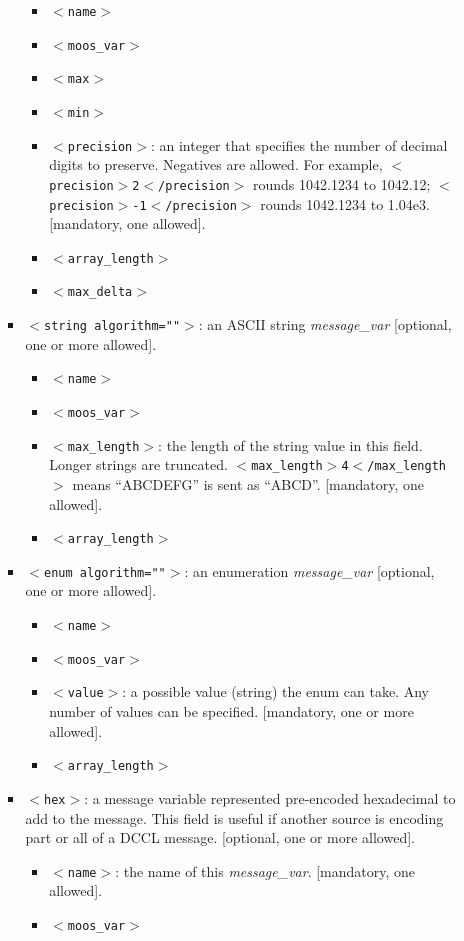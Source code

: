 \documentclass[11pt, letterpaper, oneside]{memoir}
\newcommand{\xmltag}[1]{\texttt{$<$#1$>$}}
\begin{document}
\begin{itemize}
\begin{itemize}
\begin{itemize}
\begin{itemize}
\item \xmltag{name}
\item \xmltag{moos\_var}
\item \xmltag{max}
\item \xmltag{min}
\item \xmltag{precision}: an integer that specifies the number of decimal digits to preserve. Negatives are allowed. For example, \xmltag{precision$>$2$<$/precision} rounds 1042.1234 to 1042.12; \xmltag{precision$>$-1$<$/precision} rounds 1042.1234 to 1.04e3. [mandatory, one allowed].
\item \xmltag{array\_length}
\item \xmltag{max\_delta}
\end{itemize}
\item \xmltag{string algorithm=""}: an ASCII string \textit{message\_var} [optional, one or more allowed].
\begin{itemize}
\item \xmltag{name}
\item \xmltag{moos\_var}
\item \xmltag{max\_length}: the length of the string value in this field. Longer strings are truncated. \xmltag{max\_length$>$4$<$/max\_length} means ``ABCDEFG'' is sent as ``ABCD''. [mandatory, one allowed].
\item \xmltag{array\_length}
\end{itemize}
\item \xmltag{enum algorithm=""}: an enumeration \textit{message\_var} [optional, one or more allowed].
\begin{itemize}
\item \xmltag{name}
\item \xmltag{moos\_var}
\item \xmltag{value}: a possible value (string) the enum can take. Any number of values can be specified. [mandatory, one or more allowed].
\item \xmltag{array\_length}
\end{itemize}
\item \xmltag{hex}: a message variable represented pre-encoded hexadecimal to add to the message. This field is useful if another source is encoding part or all of a DCCL message. [optional, one or more allowed]. 
\begin{itemize}
\item \xmltag{name}: the name of this \textit{message\_var}. [mandatory, one allowed].
\item \xmltag{moos\_var}

\end{itemize}
\end{itemize}
\end{itemize}
\end{itemize}
\end{document}
